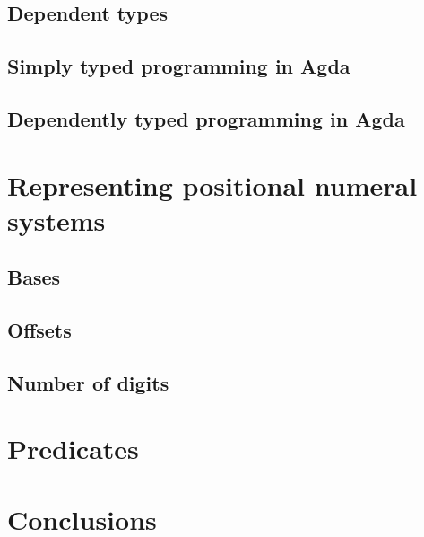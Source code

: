 \documentclass[12pt, a4paper]{article}
\begin{document}
\subsection{Dependent types}

\subsection{Simply typed programming in Agda}

\subsection{Dependently typed programming in Agda}


\section{Representing positional numeral systems}\label{representation}

\subsection{Bases}
\subsection{Offsets}
\subsection{Number of digits}

\section{Predicates}\label{representation}


\section{Conclusions}\label{conclusions}



\end{document}
